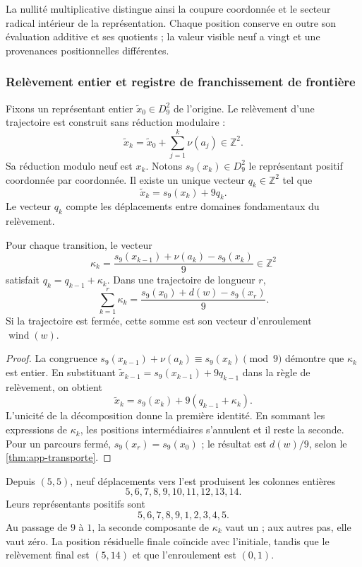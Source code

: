 La nullité multiplicative distingue ainsi la coupure coordonnée et le secteur radical intérieur de la représentation. Chaque position conserve en outre son évaluation additive et ses quotients ; la valeur visible neuf a vingt et une provenances positionnelles différentes.

\subsubsection{Relèvement entier et registre de franchissement de frontière}

Fixons un représentant entier $\widetilde x_0\in D_9^2$ de l'origine. Le relèvement d'une trajectoire est construit sans réduction modulaire :
\[
 \widetilde x_k=\widetilde x_0+\sum_{j=1}^{k}\nu(a_j)
 \in\mathbb Z^2.
\]
Sa réduction modulo neuf est $x_k$. Notons $s_9(x_k)\in D_9^2$ le représentant positif coordonnée par coordonnée. Il existe un unique vecteur $q_k\in\mathbb Z^2$ tel que
\[
 \widetilde x_k=s_9(x_k)+9q_k.
\]
Le vecteur $q_k$ compte les déplacements entre domaines fondamentaux du relèvement.

\begin{proposicion}
\label{geo:prop-cruces}
Pour chaque transition, le vecteur
\[
 \kappa_k=
 \frac{s_9(x_{k-1})+\nu(a_k)-s_9(x_k)}9
 \in\mathbb Z^2
\]
satisfait $q_k=q_{k-1}+\kappa_k$. Dans une trajectoire de longueur $r$,
\[
 \sum_{k=1}^{r}\kappa_k
 =\frac{s_9(x_0)+d(w)-s_9(x_r)}9.
\]
Si la trajectoire est fermée, cette somme est son vecteur d'enroulement $\operatorname{wind}(w)$.
\end{proposicion}

\begin{proof}
La congruence $s_9(x_{k-1})+\nu(a_k)\equiv s_9(x_k)\pmod9$ démontre que $\kappa_k$ est entier. En substituant $\widetilde x_{k-1}=s_9(x_{k-1})+9q_{k-1}$ dans la règle de relèvement, on obtient
\[
 \widetilde x_k=s_9(x_k)+9(q_{k-1}+\kappa_k).
\]
L'unicité de la décomposition donne la première identité. En sommant les expressions de $\kappa_k$, les positions intermédiaires s'annulent et il reste la seconde. Pour un parcours fermé, $s_9(x_r)=s_9(x_0)$ ; le résultat est $d(w)/9$, selon le \cref{thm:app-transporte}.
\end{proof}

\begin{ejemplo}
Depuis $(5,5)$, neuf déplacements vers l'est produisent les colonnes entières
\[
 5,6,7,8,9,10,11,12,13,14.
\]
Leurs représentants positifs sont
\[
 5,6,7,8,9,1,2,3,4,5.
\]
Au passage de $9$ à $1$, la seconde composante de $\kappa_k$ vaut un ; aux autres pas, elle vaut zéro. La position résiduelle finale coïncide avec l'initiale, tandis que le relèvement final est $(5,14)$ et que l'enroulement est $(0,1)$.
\end{ejemplo}

